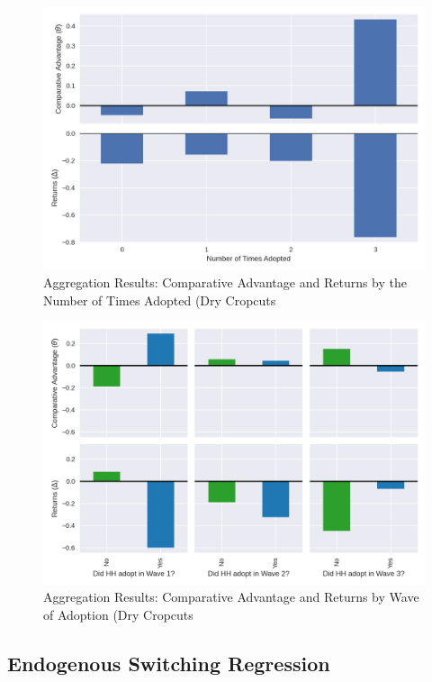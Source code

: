 \documentclass{article}
\begin{document}
\begin{figure}
    \centering
    \includegraphics[scale=0.75]{results/figures/traj_sum.png}
    \caption{Aggregation Results: Comparative Advantage and Returns by the Number of Times Adopted (Dry Cropcuts}
    \label{fig:traj_sum}
\end{figure}

\begin{figure}
    \centering
    \includegraphics[scale=0.75]{results/figures/when_adopt_cropcut.png}
    \caption{Aggregation Results: Comparative Advantage and Returns by Wave of Adoption (Dry Cropcuts}
    \label{fig:when_adopt}
\end{figure}

\subsection{Endogenous Switching Regression}
\end{document}
